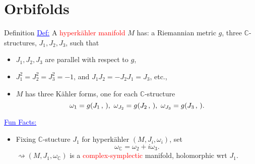 \section{Orbifolds}

\begin{frame}{Definition}
    \textcolor{blue}{\underline{Def:}} A \textcolor{red}{hyperk\"ahler manifold} $M$ has: a Riemannian metric $g$, three $\mathbb{C}$-structures, $J_{1}, J_{2}, J_{3}$, such that
        \begin{itemize}
            \item $J_{1}, J_{2}, J_{3}$ are parallel with respect to $g$,
            \item $J_{1}^{2} = J_{2}^{2} = J_{3}^{2} = -1$, and $J_{1}J_{2} = -J_{2}J_{1} = J_{3}$, etc.,
            \item $M$ has three K\"ahler forms, one for each $\mathbb{C}$-structure
            \[
                \omega_{1} = g(J_{1}\,,\,),\ \omega_{J_{2}} = g(J_{2}\,,\,),\ \omega_{J_{3}} = g(J_{3}\,,\,).    
            \]
        \end{itemize}        
    \textcolor{blue}{\underline{Fun Facts:}}
    \begin{itemize}
        \item Fixing $\mathbb{C}$-stucture $J_{1}$ for hyperk\"ahler $(M, J_{i}, \omega_{i})$, set
        \[
            \omega_{\mathbb{C}} = \omega_{2} + i\omega_{3}.    
        \]
        $\rightsquigarrow (M,J_{1}, \omega_{\mathbb{C}})$ is a \textcolor{red}{complex-symplectic} manifold, holomorphic wrt $J_{1}$.
    \end{itemize}
\end{frame}
